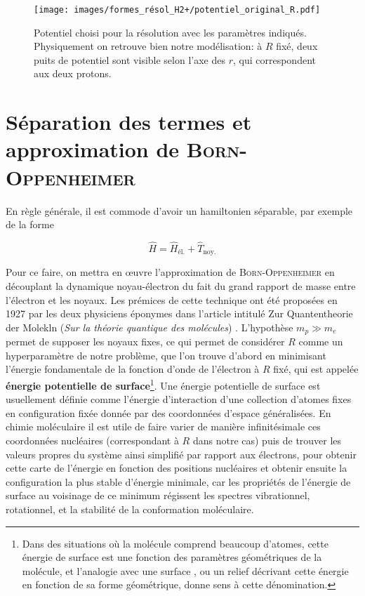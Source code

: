 \documentclass[svgnames,dvipsnames,a4paper,10pt,french]{report}
\begin{document}
\begin{figure}
    \centering
    \texttt{[image: images/formes\_résol\_H2+/potentiel\_original\_R.pdf]}
    \caption[Potentiel choisi pour la résolution avec les paramètres choisis de la modélisation]{Potentiel choisi pour la résolution avec les paramètres indiqués.  Physiquement on retrouve bien notre modélisation: à $R$ fixé, deux puits de potentiel sont visible selon l'axe des $r$, qui correspondent aux deux protons.}
    \label{fig:potentiel_params_indiques}
\end{figure}


\section{Séparation des termes et approximation de \textsc{Born-Oppenheimer}}
En règle générale, il est commode d'avoir un hamiltonien séparable, par exemple de la forme

\begin{equation}
    \hat{H} = \hat{H}_{\text{él.}} + \hat{T}_{\text{noy.}}
\end{equation}


Pour ce faire, on mettra en \oe{}uvre l'approximation de \textsc{Born-Oppenheimer} en découplant la dynamique noyau-électron du fait du grand rapport de masse entre l'électron et les noyaux. Les prémices de cette technique ont  été proposées en 1927 par les deux physiciens éponymes dans l'article intitulé \og Zur Quantentheorie der Molekln \fg{} (\textit{Sur la théorie quantique des molécules}) \cite{born_zur_1927}. L'hypothèse $m_p \gg m_e$ permet de supposer les noyaux fixes, ce qui permet de considérer $R$ comme un hyperparamètre de notre problème, que l'on trouve d'abord  en minimisant l'énergie fondamentale de la fonction d'onde de l'électron à $R$ fixé, qui est appelée \textbf{énergie potentielle de surface}\footnote{Dans des situations où la molécule comprend beaucoup d'atomes, cette énergie de surface est une fonction des paramètres géométriques de la molécule, et l'analogie avec une  \og surface \fg{}, ou un relief décrivant cette énergie en fonction de sa forme géométrique, donne sens à cette dénomination.}. Une énergie potentielle de surface  est usuellement définie comme l'énergie d'interaction d'une collection d'atomes fixes en configuration fixée donnée par des coordonnées d'espace généralisées. En chimie moléculaire il est utile de faire varier de manière infinitésimale ces coordonnées nucléaires (correspondant à $R$ dans notre cas) puis de trouver les valeurs propres du système ainsi simplifié par rapport aux électrons, pour obtenir cette \og carte \fg{} de l'énergie en fonction des positions nucléaires et obtenir ensuite la configuration la plus stable d'énergie minimale, car les propriétés de l'énergie de surface au voisinage de ce minimum régissent les spectres vibrationnel, rotationnel, et la stabilité de la conformation moléculaire.
\end{document}
